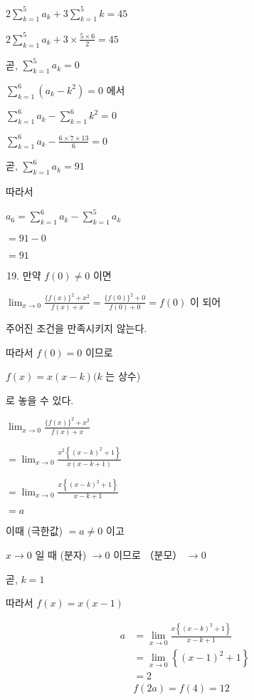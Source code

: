 \documentclass[10pt]{article}
\begin{document}
\(2 \sum_{k=1}^{5} a_{k}+3 \sum_{k=1}^{5} k=45\)

\(2 \sum_{k=1}^{5} a_{k}+3 \times \frac{5 \times 6}{2}=45\)

곧, \(\sum_{k=1}^{5} a_{k}=0\)

\(\sum_{k=1}^{6}\left(a_{k}-k^{2}\right)=0\) 에서

\(\sum_{k=1}^{6} a_{k}-\sum_{k=1}^{6} k^{2}=0\)

\(\sum_{k=1}^{6} a_{k}-\frac{6 \times 7 \times 13}{6}=0\)

곧, \(\sum_{k=1}^{6} a_{k}=91\)

따라서

\(a_{6}=\sum_{k=1}^{6} a_{k}-\sum_{k=1}^{5} a_{k}\)

\(=91-0\)

\(=91\)

\begin{enumerate}
  \setcounter{enumi}{18}
  \item 만약 \(f(0) \neq 0\) 이면
\end{enumerate}

\(\lim _{x \rightarrow 0} \frac{\{f(x)\}^{2}+x^{2}}{f(x)+x}=\frac{\{f(0)\}^{2}+0}{f(0)+0}=f(0)\) 이 되어

주어진 조건을 만족시키지 않는다.

따라서 \(f(0)=0\) 이므로

\(f(x)=x(x-k)(k\) 는 상수)

로 놓을 수 있다.

\(\lim _{x \rightarrow 0} \frac{\{f(x)\}^{2}+x^{2}}{f(x)+x}\)

\(=\lim _{x \rightarrow 0} \frac{x^{2}\left\{(x-k)^{2}+1\right\}}{x(x-k+1)}\)

\(=\lim _{x \rightarrow 0} \frac{x\left\{(x-k)^{2}+1\right\}}{x-k+1}\)

\(=a\)

이때 (극한값) \(=a \neq 0\) 이고

\(x \rightarrow 0\) 일 때 (분자) \(\rightarrow 0\) 이므로 （분모） \(\rightarrow 0\)

곧, \(k=1\)

따라서 \(f(x)=x(x-1)\)

\[
\begin{aligned}
a & =\lim _{x \rightarrow 0} \frac{x\left\{(x-k)^{2}+1\right\}}{x-k+1} \\
& =\lim _{x \rightarrow 0}\left\{(x-1)^{2}+1\right\} \\
& =2 \\
& f(2 a)=f(4)=12
\end{aligned}
\]
\end{document}

